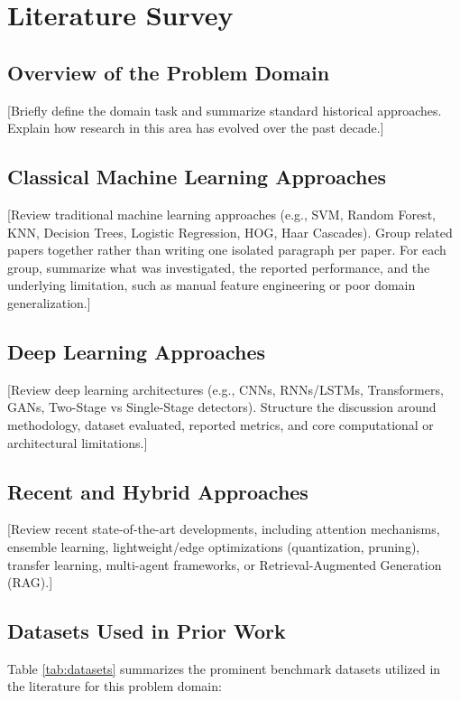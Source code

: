 \chapter{Literature Survey}

\section{Overview of the Problem Domain}
[Briefly define the domain task and summarize standard historical approaches. Explain how research in this area has evolved over the past decade.]

\section{Classical Machine Learning Approaches}
[Review traditional machine learning approaches (e.g., SVM, Random Forest, KNN, Decision Trees, Logistic Regression, HOG, Haar Cascades). Group related papers together rather than writing one isolated paragraph per paper. For each group, summarize what was investigated, the reported performance, and the underlying limitation, such as manual feature engineering or poor domain generalization.]

\section{Deep Learning Approaches}
[Review deep learning architectures (e.g., CNNs, RNNs/LSTMs, Transformers, GANs, Two-Stage vs Single-Stage detectors). Structure the discussion around methodology, dataset evaluated, reported metrics, and core computational or architectural limitations.]

\section{Recent and Hybrid Approaches}
[Review recent state-of-the-art developments, including attention mechanisms, ensemble learning, lightweight/edge optimizations (quantization, pruning), transfer learning, multi-agent frameworks, or Retrieval-Augmented Generation (RAG).]

\section{Datasets Used in Prior Work}
Table \ref{tab:datasets} summarizes the prominent benchmark datasets utilized in the literature for this problem domain:

